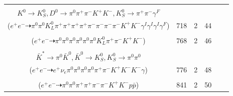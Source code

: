 \documentclass[landscape]{article}
\newcounter{rownumbers}
\newcommand\rn{\stepcounter{rownumbers}\arabic{rownumbers}}
\newcommand{\EOLP}{\\ \hline} %
\newcommand{\topoTags}[1]{#1} %
\begin{document}
\begin{longtable}{clcccc}
\rn & \makecell[l]{ $ 
e^{+} e^{-} \rightarrow \bar{K}^{0} K^{*+} D^{-} D^{*0} \gamma^{I} \gamma^{I} \gamma^{I} ,
\bar{K}^{0} \rightarrow K_{S}^{0} ,
K^{*+} \rightarrow \pi^{+} K^{0} ,
D^{-} \rightarrow K_{L}^{0} \pi^{-} ,
D^{*0} \rightarrow \pi^{0} D^{0} ,
K_{S}^{0} \rightarrow \pi^{+} \pi^{-} ,
$ \\ $
K^{0} \rightarrow K_{S}^{0} ,
D^{0} \rightarrow \pi^{0} \pi^{+} \pi^{-} K^{+} K^{-} ,
K_{S}^{0} \rightarrow \pi^{+} \pi^{-} \gamma^{F} 
$ \\ ($
e^{+} e^{-} \dashrightarrow \pi^{0} \pi^{0} K_{L}^{0} \pi^{+} \pi^{+} \pi^{+} \pi^{+} \pi^{-} \pi^{-} \pi^{-} \pi^{-} K^{+} K^{-} \gamma^{I} \gamma^{I} \gamma^{I} \gamma^{F} 
$) } & \topoTags{718 & }2 & 44 \EOLP

\rn & \makecell[l]{ $ 
e^{+} e^{-} \rightarrow \pi^{0} \pi^{0} \pi^{-} D_{2}^{*+} \bar{D}^{*0} ,
D_{2}^{*+} \rightarrow \pi^{+} D^{0} ,
\bar{D}^{*0} \rightarrow \pi^{0} \bar{D}^{0} ,
D^{0} \rightarrow K^{+} K^{-} ,
\bar{D}^{0} \rightarrow \pi^{0} \pi^{0} \pi^{0} K_{L}^{0} 
$ \\ ($
e^{+} e^{-} \dashrightarrow \pi^{0} \pi^{0} \pi^{0} \pi^{0} \pi^{0} \pi^{0} K_{L}^{0} \pi^{+} \pi^{-} K^{+} K^{-} 
$) } & \topoTags{768 & }2 & 46 \EOLP

\rn & \makecell[l]{ $ 
e^{+} e^{-} \rightarrow \pi^{-} K^{+} D_{2}^{*+} D_{s}^{*-} ,
D_{2}^{*+} \rightarrow \pi^{0} D^{+} ,
D_{s}^{*-} \rightarrow D_{s}^{-} \gamma ,
D^{+} \rightarrow e^{+} \nu_{e} \bar{K}^{*} ,
D_{s}^{-} \rightarrow \bar{K}^{*} K^{-} ,
\bar{K}^{*} \rightarrow \pi^{+} K^{-} ,
$ \\ $
\bar{K}^{*} \rightarrow \pi^{0} \bar{K}^{0} ,
\bar{K}^{0} \rightarrow K_{S}^{0} ,
K_{S}^{0} \rightarrow \pi^{0} \pi^{0} 
$ \\ ($
e^{+} e^{-} \dashrightarrow e^{+} \nu_{e} \pi^{0} \pi^{0} \pi^{0} \pi^{0} \pi^{+} \pi^{-} K^{+} K^{-} K^{-} \gamma 
$) } & \topoTags{776 & }2 & 48 \EOLP

\rn & \makecell[l]{ $ 
e^{+} e^{-} \rightarrow \pi^{0} \Sigma_{c}^{*++} \bar{\Sigma}_{c}^{*--} ,
\Sigma_{c}^{*++} \rightarrow \pi^{+} \Lambda_{c}^{+} ,
\bar{\Sigma}_{c}^{*--} \rightarrow \pi^{-} \bar{\Lambda}_{c}^{-} ,
\Lambda_{c}^{+} \rightarrow \pi^{0} \pi^{+} K^{-} p ,
\bar{\Lambda}_{c}^{-} \rightarrow K^{+} \bar{\Delta}^{--} ,
\bar{\Delta}^{--} \rightarrow \pi^{-} \bar{p} 
$ \\ ($
e^{+} e^{-} \dashrightarrow \pi^{0} \pi^{0} \pi^{+} \pi^{+} \pi^{-} \pi^{-} K^{+} K^{-} p \bar{p} 
$) } & \topoTags{841 & }2 & 50 \EOLP


\end{longtable}
\end{document}
